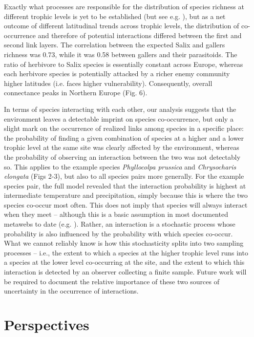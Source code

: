 \documentclass[12pt]{article}
\begin{document}
Exactly what processes are responsible for the distribution of species
richness at different trophic levels is yet to be established (but see e.g.
\citealt{Roininen2005, Nyman2010, Leppanen2014}), but as a net
outcome of different latitudinal trends across trophic levels, the
distribution of co-occurrence and therefore of potential interactions differed
between the first and second link layers. The correlation between the expected
Salix and gallers richness was 0.73, while it was 0.58 between gallers and
their parasitoids. The ratio of herbivore to Salix species is essentially constant
across Europe, whereas each herbivore species is potentially attacked by a
richer enemy community higher latitudes (i.e. faces higher vulnerability).
Consequently, overall connectance peaks in Northern Europe (Fig. 6).

In terms of species interacting with each other, our analysis suggests that the
environment leaves a detectable imprint on species co-occurrence, but only a
slight mark on the occurrence of realized links among species in a specific
place: the probability of finding a given combination of species at a higher
and a lower trophic level at the same site was clearly affected by the
environment, whereas the probability of observing an interaction between the
two was not detectably so. This applies to the example species \textit{Phyllocolpa
prussica} and \textit{Chrysocharis elongata} (Figs 2-3), but also to all species pairs
more generally. For the example species pair, the full model revealed that the
interaction probability is highest at intermediate temperature and
precipitation, simply because this is where the two species co-occur most
often. This does not imply that species will always interact when they meet –
although this is a basic assumption in most documented metawebs to date (e.g.
\citealt{Havens1992, Wood2015}). Rather, an interaction is a stochastic process whose
probability is also influenced by the probability with which species co-occur.
What we cannot reliably know is how this stochasticity splits into two
sampling processes – i.e., the extent to which a species at the higher trophic
level runs into a species at the lower level co-occurring at the site, and the
extent to which this interaction is detected by an observer collecting a
finite sample. Future work will be required to document the relative
importance of these two sources of uncertainty in the occurrence of
interactions.

\section*{Perspectives}
\end{document}
